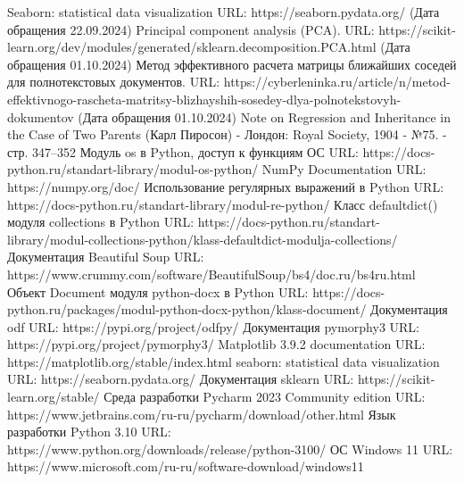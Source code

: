 \begin{thebibliography}{}
	Seaborn: statistical data visualization
	URL: https://seaborn.pydata.org/ (Дата обращения 22.09.2024)
	Principal component analysis (PCA).
	URL: https://scikit-learn.org/dev/modules/generated/sklearn.decomposition.PCA.html (Дата обращения 01.10.2024)
	Метод эффективного расчета матрицы ближайших соседей для полнотекстовых документов.
	URL: https://cyberleninka.ru/article/n/metod-effektivnogo-rascheta-matritsy-blizhayshih-sosedey-dlya-polnotekstovyh-dokumentov (Дата обращения 01.10.2024)
	Note on Regression and Inheritance in the Case of Two Parents (Карл Пиросон) - Лондон: Royal Society, 1904 - №75. - стр. 347–352
	Модуль os в Python, доступ к функциям ОС
    URL: https://docs-python.ru/standart-library/modul-os-python/
	NumPy Documentation
    URL: https://numpy.org/doc/
	Использование регулярных выражений в Python
    URL: https://docs-python.ru/standart-library/modul-re-python/
	Класс defaultdict() модуля collections в Python
    URL: https://docs-python.ru/standart-library/modul-collections-python/klass-defaultdict-modulja-collections/
	Документация Beautiful Soup
    URL: https://www.crummy.com/software/BeautifulSoup/bs4/doc.ru/bs4ru.html
	Объект Document модуля python-docx в Python
    URL: https://docs-python.ru/packages/modul-python-docx-python/klass-document/
	Документация odf
    URL: https://pypi.org/project/odfpy/
	Документация pymorphy3
    URL: https://pypi.org/project/pymorphy3/
	Matplotlib 3.9.2 documentation
    URL: https://matplotlib.org/stable/index.html
	seaborn: statistical data visualization
    URL: https://seaborn.pydata.org/
	Документация sklearn
    URL: https://scikit-learn.org/stable/
	Среда разработки Pycharm 2023 Community edition
	URL: https://www.jetbrains.com/ru-ru/pycharm/download/other.html
	Язык разработки Python 3.10
	URL: https://www.python.org/downloads/release/python-3100/
	ОС Windows 11
	URL: https://www.microsoft.com/ru-ru/software-download/windows11
\end{thebibliography}